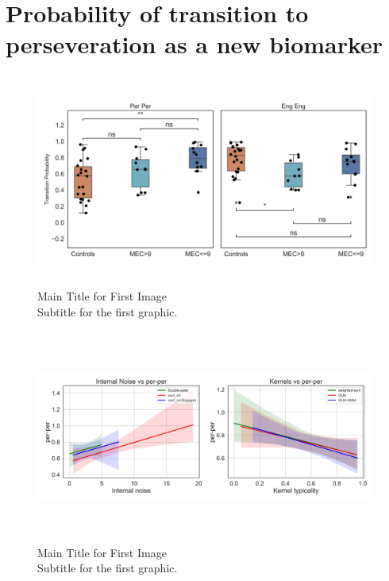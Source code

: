 \section{Probability of transition to perseveration as a new biomarker} 
\begin{figure}[H]
    \centering
    \includegraphics[width=17cm,height=7cm]{MainLayout/Images/chapter8/sticky_state.jpg}
    \caption{Main Title for First Image \\ \small Subtitle for the first graphic.}
    \label{fig:sticky_state}
\end{figure}
\begin{figure}[H]
    \centering
    \includegraphics[width=17cm,height=7cm]{MainLayout/Images/chapter8/regression_results_per_per.jpg}
    \caption{Main Title for First Image \\ \small Subtitle for the first graphic.}
    \label{fig:regression_results_per_per}
\end{figure}
